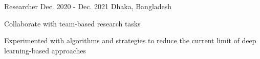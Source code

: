 \begin{cventries}
  \cventry
    {} %
    {Researcher} %
    {Dec. 2020 - Dec. 2021} %
    {Dhaka, Bangladesh} %
    {
      \begin{cvitems} %
        \item {Collaborate with team-based research tasks}
        \item {Experimented with algorithms and strategies to reduce the current limit of deep learning-based approaches}
      \end{cvitems}
    }

\end{cventries}

